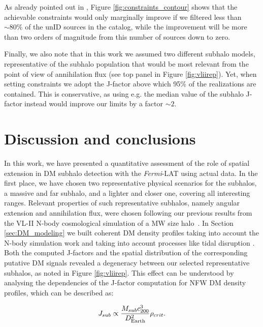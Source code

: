 \documentclass[%
 reprint,
nofootinbib,
 amsmath,amssymb,
 aps,
]{revtex4-2}
\begin{document}
As already pointed out in , Figure \ref{fig:constraints_contour} shows that the achievable constraints would only marginally improve if we filtered less than $\sim80\%$ of the unID sources in the catalog, while the improvement will be more than two orders of magnitude from this number of sources down to zero. 

Finally, we also note that in this work we assumed two different subhalo models, representative of the subhalo population that would be most relevant from the point of view of annihilation flux (see top panel in Figure \ref{fig:vliirep}). Yet, when setting constraints we adopt the J-factor above which 95\% of the realizations are contained. This is conservative, as using e.g. the median value of the subhalo J-factor instead would improve our limits by a factor $\sim2$.



\section{Discussion and conclusions}
\label{sec:conclusions}
In this work, we have presented a quantitative assessment of the role of spatial extension in DM subhalo detection with the \textit{Fermi}-LAT using actual data. In the first place, 
we have chosen two representative physical scenarios for the subhalos, a massive and far subhalo, and a lighter and closer one, covering all interesting ranges. 
Relevant properties of such representative subhalos, namely angular extension and annihilation flux, were chosen following our previous results from the VL-II N-body cosmological simulation of a MW size halo~\citep{CoronadoBlazquez2019a}. 
In Section \ref{sec:DM_modeling} we built coherent DM density profiles taking into account the N-body simulation work and taking into account processes like tidal disruption \citep{Moline+17}. 
Both the computed J-factors and the spatial distribution of the corresponding putative DM signals revealed a degeneracy between our selected representative subhalos, as noted in Figure \ref{fig:vliirep}. This effect can be understood by analysing the dependencies of the J-factor computation for NFW DM density profiles, which can be described as:

\begin{equation}\label{eq:j-propto}
J_{sub}\propto\frac{M_{sub}c_{200}^3}{D_{\rm Earth}^2}\rho_{crit}.
\end{equation}
\end{document}
